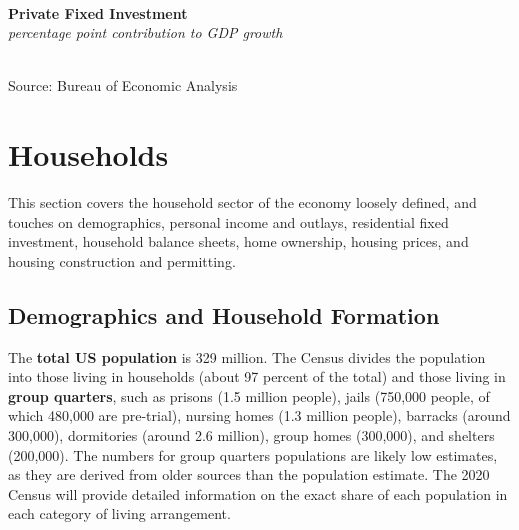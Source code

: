 \documentclass{report}
\makeatletter
\newcommand{\tbllink}[1]{\href{https://raw.githubusercontent.com/bdecon/US-chartbook/master/chartbook/data/#1}{\faTable}}
\newcommand*\short[1]{\expandafter\@gobbletwo\number\numexpr#1\relax}
\newcommand{\sbar}[4]{
		\addplot[ybar stacked, bar width=2.6pt, draw opacity=0, fill=#1] 
			table [x=#2, y=#3, col sep=comma]{#4};}
\newcommand{\dateaxisticks}{
		date coordinates in=x, axis line style={draw=none},
		xmax={2020-05-10},
		max space between ticks=40,	    
		xtick={{1990-01-01}, {1992-01-01}, {1994-01-01}, 
			{1996-01-01}, {1998-01-01}, {2000-01-01}, 
			{2002-01-01}, {2004-01-01}, {2006-01-01},
			{2008-01-01}, {2010-01-01}, {2012-01-01}, {2014-01-01},
		    {2016-01-01}, {2018-01-01}, {2020-01-01}},
		minor xtick={{1989-01-01}, {1991-01-01}, {1993-01-01},
			{1995-01-01}, {1997-01-01}, {1999-01-01}, 
			{2001-01-01}, {2003-01-01}, {2005-01-01}, {2007-01-01},
		    {2009-01-01}, {2011-01-01}, {2013-01-01}, {2015-01-01},
		    {2017-01-01}, {2019-01-01}},
		enlarge y limits={0.06}, enlarge x limits={0.01},
		}
\newcommand{\bbar}[2]{extra #1 ticks = {{#2}}, extra #1 tick labels = ,
		extra #1 tick style = {grid=major, grid style={thick, black!25}},}
\newcommand{\rbars}{
		\fill[color=black!10] (axis cs:{1990-07-01},\pgfkeysvalueof{/pgfplots/ymin}) rectangle 
			(axis cs:{1991-03-01}, \pgfkeysvalueof{/pgfplots/ymax});
		\fill[color=black!10] (axis cs:{2007-12-01},\pgfkeysvalueof{/pgfplots/ymin}) rectangle 
			(axis cs:{2009-07-01}, \pgfkeysvalueof{/pgfplots/ymax});
		\fill[color=black!10] (axis cs:{2001-03-01},\pgfkeysvalueof{/pgfplots/ymin}) rectangle 
			(axis cs:{2001-11-01}, \pgfkeysvalueof{/pgfplots/ymax});}
\makeatother
\begin{document}
{{{\begin{minipage}{0.76\textwidth}
 \\

\vspace{4mm} 

\noindent \normalsize \textbf{Private Fixed Investment}\\
\footnotesize{\textit{percentage point contribution to GDP growth}}\\
\noindent \hspace*{-3mm} \\
\footnotesize{Source: Bureau of Economic Analysis} \hfill \tbllink{inv.csv} 

\end{minipage}

\newpage
\section*{\color{darkgray}\LARGE \seriffont Households}
\label{sec:hh}

\begin{minipage}{0.76\textwidth}
\small This section covers the household sector of the economy loosely defined, and touches on demographics, personal income and outlays, residential fixed investment, household balance sheets, home ownership, housing prices, and housing construction and permitting.


\subsection*{\color{black!70} \seriffont Demographics and Household Formation}

The \textbf{total US population} is 329 million. The Census divides the population into those living in households (about 97 percent of the total) and those living in \textbf{group quarters}, such as prisons (1.5 million people), jails (750,000 people, of which 480,000 are pre-trial), nursing homes (1.3 million people), barracks (around 300,000), dormitories (around 2.6 million), group homes (300,000), and shelters (200,000). The numbers for group quarters populations are likely low estimates, as they are derived from older sources than the population estimate. The 2020 Census will provide detailed information on the exact share of each population in each category of living arrangement.\\ 


\end{minipage}}}}
\end{document}
